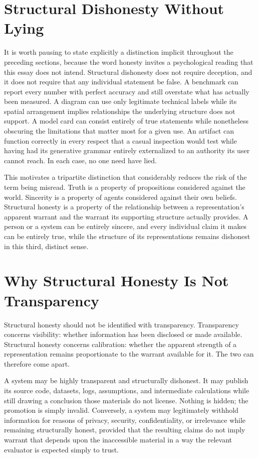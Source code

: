 \documentclass[11pt]{article}
\begin{document}
\section{Structural Dishonesty Without Lying}

It is worth pausing to state explicitly a distinction implicit throughout the preceding sections, because the word honesty invites a psychological reading that this essay does not intend. Structural dishonesty does not require deception, and it does not require that any individual statement be false. A benchmark can report every number with perfect accuracy and still overstate what has actually been measured. A diagram can use only legitimate technical labels while its spatial arrangement implies relationships the underlying structure does not support. A model card can consist entirely of true statements while nonetheless obscuring the limitations that matter most for a given use. An artifact can function correctly in every respect that a casual inspection would test while having had its generative grammar entirely externalized to an authority its user cannot reach. In each case, no one need have lied.

This motivates a tripartite distinction that considerably reduces the risk of the term being misread. Truth is a property of propositions considered against the world. Sincerity is a property of agents considered against their own beliefs. Structural honesty is a property of the relationship between a representation's apparent warrant and the warrant its supporting structure actually provides. A person or a system can be entirely sincere, and every individual claim it makes can be entirely true, while the structure of its representations remains dishonest in this third, distinct sense.

\section{Why Structural Honesty Is Not Transparency}
\label{sec:not-transparency}

Structural honesty should not be identified with transparency. Transparency concerns visibility: whether information has been disclosed or made available. Structural honesty concerns calibration: whether the apparent strength of a representation remains proportionate to the warrant available for it. The two can therefore come apart.

A system may be highly transparent and structurally dishonest. It may publish its source code, datasets, logs, assumptions, and intermediate calculations while still drawing a conclusion those materials do not license. Nothing is hidden; the promotion is simply invalid. Conversely, a system may legitimately withhold information for reasons of privacy, security, confidentiality, or irrelevance while remaining structurally honest, provided that the resulting claims do not imply warrant that depends upon the inaccessible material in a way the relevant evaluator is expected simply to trust.
\end{document}
